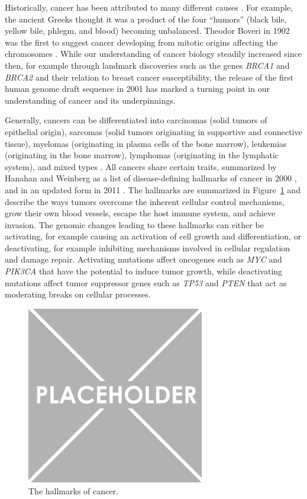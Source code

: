 \documentclass[11pt]{book}
\begin{document}
Historically, cancer has been attributed to many different causes \cite{Blackadar:2016}. For example, the ancient Greeks thought it was a product of the four ``humors'' (black bile, yellow bile, phlegm, and blood) becoming unbalanced. Theodor Boveri in 1902 was the first to suggest cancer developing from mitotic origins affecting the chromosomes \cite{Boveri:1902}. While our understanding of cancer biology steadily increased since then, for example through landmark discoveries such as the genes \textit{BRCA1} \cite{Hall:1990, Miki:1994} and \textit{BRCA2} \cite{Wooster:1994, Wooster:1995} and their relation to breast cancer susceptibility, the release of the first human genome draft sequence in 2001 \cite{HGP:2001, Venter:2001} has marked a turning point in our understanding of cancer and its underpinnings.

Generally, cancers can be differentiated into carcinomas (solid tumors of epithelial origin), sarcomas (solid tumors originating in supportive and connective tissue), myelomas (originating in plasma cells of the bone marrow), leukemias (originating in the bone marrow), lymphomas (originating in the lymphatic system), and mixed types \cite{who-icd-o}. All cancers share certain traits, summarized by Hanahan and Weinberg as a list of disease-defining hallmarks of cancer in 2000 \cite{Hanahan:2000}, and in an updated form in 2011 \cite{Hanahan:2011}. The hallmarks are summarized in Figure~\ref{fig:hallmarks} and describe the ways tumors overcome the inherent cellular control mechanisms, grow their own blood vessels, escape the host immune system, and achieve invasion. The genomic changes leading to these hallmarks can either be activating, for example causing an activation of cell growth and differentiation, or deactivating, for example inhibiting mechanisms involved in cellular regulation and damage repair. Activating mutations affect oncogenes such as \textit{MYC} and \textit{PIK3CA} that have the potential to induce tumor growth, while deactivating mutations affect tumor suppressor genes such as \textit{TP53} and \textit{PTEN} that act as moderating breaks on cellular processes.

\begin{figure}[t]
\centering
\includegraphics[width=220pt]{img/placeholder.png}
\caption[The Hallmarks of Cancer]{The hallmarks of cancer.}
\label{fig:hallmarks}
\end{figure}
\end{document}
